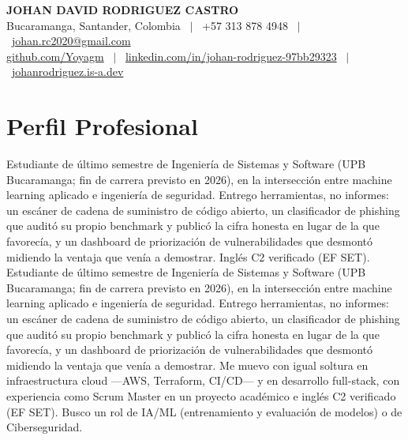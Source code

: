 %
%


\begin{center}
  {\sffamily\bfseries\color{accent}\fontsize{18}{21}\selectfont
   JOHAN DAVID RODRIGUEZ CASTRO}\\[0.5ex]
  {\footnotesize\color{subtle}
   Bucaramanga, Santander, Colombia
   \ $\vert$ \ +57 313 878 4948
   \ $\vert$ \ \href{mailto:johan.rc2020@gmail.com}{johan.rc2020@gmail.com}}\\[0.4ex]
  {\footnotesize
   \href{https://github.com/Yoyagm}{github.com/Yoyagm}
   \ {\color{subtle}$\vert$} \
   \href{https://www.linkedin.com/in/johan-rodriguez-97bb29323/}{linkedin.com/in/johan-rodriguez-97bb29323}
   \ {\color{subtle}$\vert$} \
   \href{https://johanrodriguez.is-a.dev/es}{johanrodriguez.is-a.dev}}
\end{center}
\vspace{0.2ex}

\section{Perfil Profesional}
\justifying
\ifonepage
Estudiante de último semestre de Ingeniería de Sistemas y Software (UPB Bucaramanga; fin de carrera
previsto en 2026), en la intersección entre machine learning aplicado e ingeniería de seguridad.
Entrego herramientas, no informes: un escáner de cadena de suministro de código abierto, un
clasificador de phishing que auditó su propio benchmark y publicó la cifra honesta en lugar de la que
favorecía, y un dashboard de priorización de vulnerabilidades que desmontó midiendo la ventaja que
venía a demostrar. Inglés C2 verificado (EF SET).
\else
Estudiante de último semestre de Ingeniería de Sistemas y Software (UPB Bucaramanga; fin de carrera
previsto en 2026), en la intersección entre machine learning aplicado e ingeniería de seguridad.
Entrego herramientas, no informes: un escáner de cadena de suministro de código abierto, un
clasificador de phishing que auditó su propio benchmark y publicó la cifra honesta en lugar de la que
favorecía, y un dashboard de priorización de vulnerabilidades que desmontó midiendo la ventaja que
venía a demostrar. Me muevo con igual soltura en infraestructura cloud ---AWS, Terraform, CI/CD--- y en
desarrollo full-stack, con experiencia como Scrum Master en un proyecto académico e inglés C2
verificado (EF SET). Busco un rol de IA/ML (entrenamiento y evaluación de modelos) o de
Ciberseguridad.
\fi

